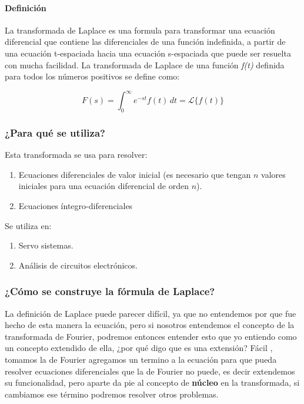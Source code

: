 \paragraph*{Definición}
La transformada de Laplace es una formula para transformar una ecuación
diferencial que contiene las diferenciales de una función indefinida, a partir de una
ecuación t-espaciada hacia una ecuación s-espaciada que puede ser resuelta con mucha facilidad.	
\newline
La transformada de Laplace de una función \textit{f(t)} definida para todos los números positivos se define como:

\[
F(s) = \int_{0}^{\infty} \! e^{-st} f(t)  \,dt = \mathscr{L}\{f(t)\}
\]

\subsubsection{¿Para qué se utiliza?}
\noindent Esta transformada se usa para resolver:
 \begin{enumerate}
	\item Ecuaciones diferenciales de valor inicial (es necesario que tengan $n$ valores iniciales para una ecuación diferencial de orden $n$).
	\item Ecuaciones íntegro-diferenciales
\end{enumerate}

\noindent Se utiliza en:

\begin{enumerate}
	\item Servo sistemas.
	\item Análisis de circuitos electrónicos.
\end{enumerate}

\subsubsection{¿Cómo se construye la fórmula de Laplace?}


La definición de Laplace puede parecer difícil, ya que  no entendemos por que fue hecho de esta manera la ecuación, pero si nosotros entendemos el concepto de la transformada de Fourier, podremos entonces entender esto que yo entiendo como un concepto extendido de ella, ¿por qué digo que es una extensión? Fácil , tomamos la de Fourier  agregamos un termino a la ecuación para que pueda resolver ecuaciones diferenciales que la de Fourier no puede, es decir extendemos su funcionalidad, pero aparte da pie al concepto de \textbf{núcleo} en la transformada, si cambiamos ese término podremos resolver otros problemas.

